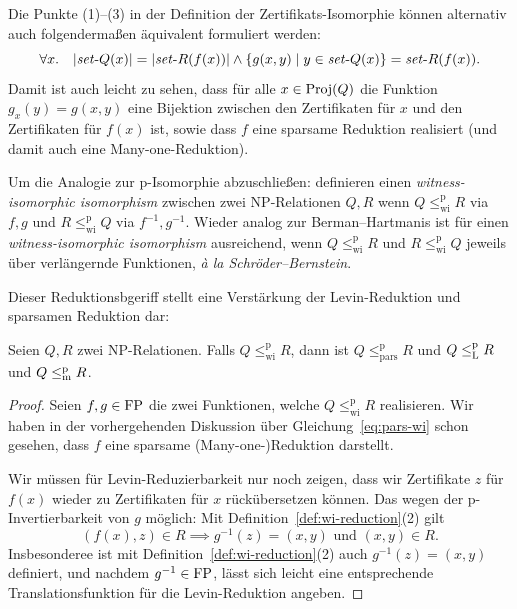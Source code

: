 Die Punkte (1)--(3) in der Definition der Zertifikats-Isomorphie können alternativ auch folgendermaßen äquivalent formuliert werden:
\begin{equation}\label{eq:pars-wi} \forall x.\quad |\mathit{set}\text{-}{}Q(x)| = |\mathit{set}\text{-}{}R(f(x))| \land \{ g(x,y) \mid y\in\mathit{set}\text{-}{}Q(x) \}  = \mathit{set}\text{-}{}R(f(x)).  \end{equation}
Damit ist auch leicht zu sehen, dass für alle $x\in\operatorname{Proj}(Q)$ die Funktion $g_x(y)= g(x,y)$ eine Bijektion zwischen den Zertifikaten für $x$ und den Zertifikaten für $f(x)$ ist, sowie dass $f$ eine sparsame Reduktion realisiert (und damit auch eine Many-one-Reduktion).

Um die Analogie zur p-Isomorphie abzuschließen: \citeauthor{wiedermann_witness-isomorphic_1995} definieren einen \emph{witness-isomorphic isomorphism} zwischen zwei NP-Relationen $Q, R$ wenn $Q\leq_\mathrm{wi}^\mathrm p R$ via $f,g$ und $R\leq_\mathrm{wi}^\mathrm p Q$ via $f^{-1}, g^{-1}$. Wieder analog zur Berman--Hartmanis ist für einen \emph{witness-isomorphic isomorphism} ausreichend, wenn $Q\leq_\mathrm{wi}^\mathrm p R$ und $R\leq_\mathrm{wi}^\mathrm p Q$ jeweils über verlängernde Funktionen, \emph{à la Schröder--Bernstein}.

Dieser Reduktionsbgeriff stellt eine Verstärkung der Levin-Reduktion und sparsamen Reduktion dar:
\begin{lemma}\label{lemma:wi-reduction}
    Seien $Q, R$ zwei NP-Relationen. Falls $Q\leq_\mathrm{wi}^\mathrm p R$, dann ist $Q\leq_\mathrm{pars}^\mathrm p R$ und $Q\leq_\mathrm{L}^\mathrm{p} R$ und $Q\leq_\mathrm{m}^\mathrm{p} R$.
\end{lemma}
\begin{proof}
    Seien $f,g\in \mathrm{FP}$ die zwei Funktionen, welche $Q\leq_\mathrm{wi}^\mathrm p R$ realisieren.
    Wir haben in der vorhergehenden Diskussion über Gleichung~\ref{eq:pars-wi} schon gesehen, dass $f$ eine sparsame (Many-one-)Reduktion darstellt.

    Wir müssen für Levin-Reduzierbarkeit nur noch zeigen, dass wir Zertifikate $z$ für $f(x)$ wieder zu Zertifikaten für $x$ rückübersetzen können. Das wegen der p-Invertierbarkeit von $g$ möglich:
    Mit Definition~\ref{def:wi-reduction}(2) gilt
    \[ (f(x), z) \in R \implies g^{-1}(z)=(x,y) \text{ und } (x,y)\in R. \]
    Insbesonderee ist mit Definition~\ref{def:wi-reduction}(2) auch $g^{-1}(z)=(x,y)$ definiert, und nachdem $g^{-1}\in\mathrm{FP}$, lässt sich leicht eine entsprechende Translationsfunktion für die Levin-Reduktion angeben.
\end{proof}

